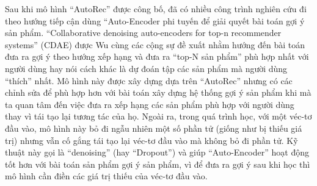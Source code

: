 
Sau khi mô hình ``AutoRec'' được công bố, đã có nhiều công trình nghiên cứu đi theo hướng tiếp cận dùng ``Auto-Encoder phi tuyến để giải quyết bài toán gợi ý sản phẩm. 
``Collaborative denoising auto-encoders for top-n recommender systems'' \cite{cdae} (CDAE) được Wu cùng các cộng sự đề xuất nhằm hướng đến bài toán đưa ra gợi ý theo hướng xếp hạng và đưa ra ``top-N sản phẩm'' phù hợp nhất với người dùng hay nói cách khác là dự đoán tập các sản phẩm mà người dùng ``thích'' nhất. 
Mô hình này được xây dựng dựa trên ``AutoRec'' nhưng có các chỉnh sửa để phù hợp hơn với bài toán xây dựng hệ thống gợi ý sản phẩm khi mà ta quan tâm đến việc đưa ra xếp hạng các sản phẩm phù hợp với người dùng thay vì tái tạo lại tương tác của họ. 
Ngoài ra, trong quá trình học, với một véc-tơ đầu vào, mô hình này bỏ đi ngẫu nhiên một số phần tử (giống như bị thiếu giá trị) nhưng vẫn cố gắng tái tạo lại véc-tơ đầu vào mà không bỏ đi phần tử. 
Kỹ thuật này gọi là ``denoising'' (hay ``Dropout'') và giúp ``Auto-Encoder'' hoạt động tốt hơn với bài toán sản phẩm gợi ý sản phẩm, vì để đưa ra gợi ý sau khi học thì mô hình cần điền các giá trị thiếu của véc-tơ đầu vào.

